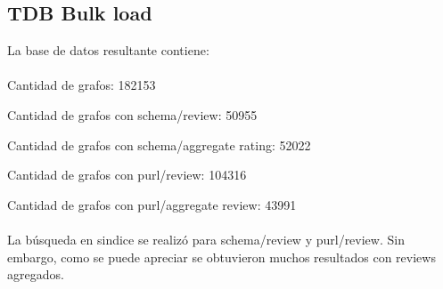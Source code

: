 \subsection{TDB Bulk load}

La base de datos resultante contiene:
\\\\
Cantidad de grafos: 182153

\noindent Cantidad de grafos con schema/review: 50955 

\noindent Cantidad de grafos con schema/aggregate rating: 52022

\noindent Cantidad de grafos con purl/review: 104316 

\noindent Cantidad de grafos con purl/aggregate review: 43991
\\\\
La búsqueda en sindice se realizó para schema/review y purl/review. Sin embargo, como se puede apreciar se obtuvieron muchos resultados con reviews agregados.
